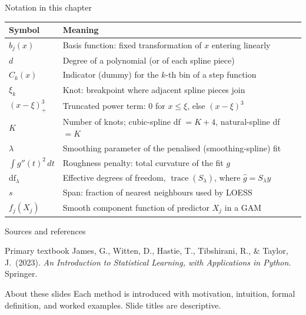 \documentclass[aspectratio=169,11pt]{beamer}
\begin{document}
\begin{frame}{Notation in this chapter}
  \footnotesize
  \begin{center}
  \begin{tabular}{@{}ll@{}}
    \toprule
    \textbf{Symbol} & \textbf{Meaning} \\
    \midrule
    $b_j(x)$ & Basis function: fixed transformation of $x$ entering linearly \\
    $d$ & Degree of a polynomial (or of each spline piece) \\
    $C_k(x)$ & Indicator (dummy) for the $k$-th bin of a step function \\
    $\xi_k$ & Knot: breakpoint where adjacent spline pieces join \\
    $(x-\xi)^3_+$ & Truncated power term: $0$ for $x\le\xi$, else $(x-\xi)^3$ \\
    $K$ & Number of knots; cubic-spline df $=K+4$, natural-spline df $=K$ \\
    $\lambda$ & Smoothing parameter of the penalised (smoothing-spline) fit \\
    $\int g''(t)^2\,dt$ & Roughness penalty: total curvature of the fit $g$ \\
    $\mathrm{df}_\lambda$ & Effective degrees of freedom, $\operatorname{trace}(S_\lambda)$, where $\hat g = S_\lambda y$ \\
    $s$ & Span: fraction of nearest neighbours used by LOESS \\
    $f_j(X_j)$ & Smooth component function of predictor $X_j$ in a GAM \\
    \bottomrule
  \end{tabular}
  \end{center}
\end{frame}

\begin{frame}{Sources and references}
  \begin{block}{Primary textbook}
    James, G., Witten, D., Hastie, T., Tibshirani, R., \& Taylor, J.\ (2023).
    \emph{An Introduction to Statistical Learning, with Applications in
    Python.} Springer.
  \end{block}
  \begin{block}{About these slides}
    Each method is introduced with motivation, intuition, formal
    definition, and worked examples. Slide titles are descriptive.
  \end{block}
\end{frame}
\end{document}
